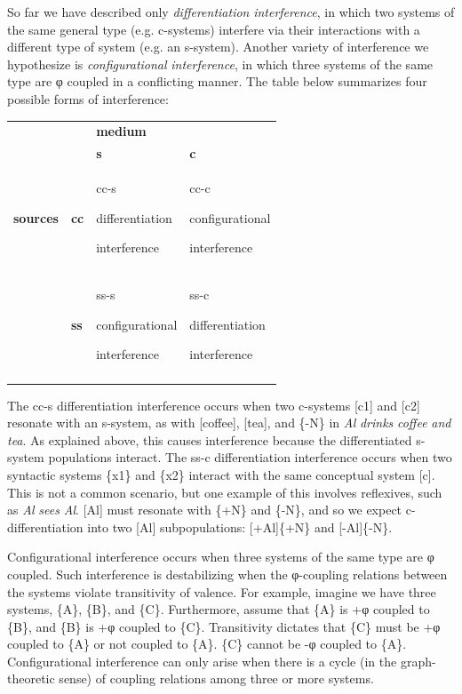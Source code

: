   So far we have described only \textit{differentiation} \textit{interference}, in which two systems of the same general type (e.g. c-systems) interfere via their interactions with a different type of system (e.g. an s-system). Another variety of interference we hypothesize is \textit{configurational} \textit{interference}, in which three systems of the same type are φ coupled in a conflicting manner. The table below summarizes four possible forms of interference:

\begin{tabularx}{\textwidth}{XXXX} &  & \textbf{medium} & \\
\lsptoprule
&  & \textbf{s} & \textbf{c}\\
\textbf{sources} & \textbf{cc} & cc-s

differentiation 

interference & cc-c

configurational

interference\\
& \textbf{ss} & ss-s

configurational

interference & ss-c

differentiation

interference\\
\lspbottomrule
\end{tabularx}
  The cc-s differentiation interference occurs when two c-systems [c1] and [c2] resonate with an s-system, as with [coffee], [tea], and \{-N\} in \textit{Al} \textit{drinks} \textit{coffee} \textit{and} \textit{tea}. As explained above, this causes interference because the differentiated s-system populations interact. The ss-c differentiation interference occurs when  two syntactic systems \{x1\} and \{x2\} interact with the same conceptual system [c]. This is not a common scenario, but one example of this involves reflexives, such as \textit{Al} \textit{sees} \textit{Al}. [Al] must resonate with \{+N\} and \{-N\}, and so we expect c-differentiation into two [Al] subpopulations: [+Al]\{+N\} and [-Al]\{-N\}.

  Configurational interference occurs when three systems of the same type are φ coupled. Such interference is destabilizing when the φ-coupling relations between the systems violate transitivity of valence. For example, imagine we have three systems, \{A\}, \{B\}, and \{C\}. Furthermore, assume that \{A\} is +φ coupled to \{B\}, and \{B\} is +φ coupled to \{C\}. Transitivity dictates that \{C\} must be +φ coupled to \{A\} or not coupled to \{A\}. \{C\} cannot be -φ coupled to \{A\}. Configurational interference can only arise when there is a cycle (in the graph-theoretic sense) of coupling relations among three or more systems. 

